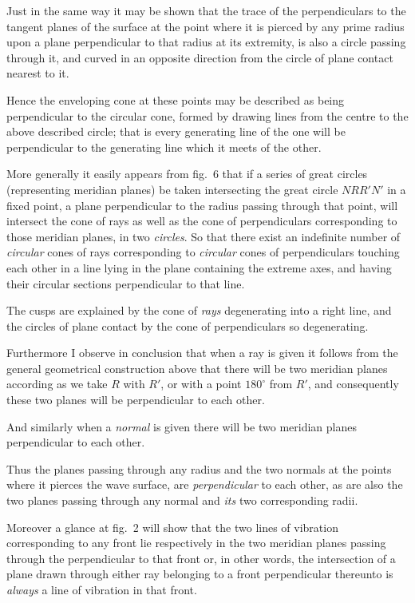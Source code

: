 \documentclass[11pt]{article}
\newcommand{\sourcepage}[1]{\marginpar{\scriptsize p.~#1}}
\begin{document}
\sourcepage{23}
Just in the same way it may be shown that the trace of the perpendiculars to the tangent planes of the surface at the point where it is pierced by any prime radius upon a plane perpendicular to that radius at its extremity, is also a circle passing through it, and curved in an opposite direction from the circle of plane contact nearest to it.

Hence the enveloping cone at these points may be described as being perpendicular to the circular cone, formed by drawing lines from the centre to the above described circle; that is every generating line of the one will be perpendicular to the generating line which it meets of the other.

More generally it easily appears from fig.~6 that if a series of great circles (representing meridian planes) be taken intersecting the great circle $NRR'N'$ in a fixed point, a plane perpendicular to the radius passing through that point, will intersect the cone of rays as well as the cone of perpendiculars corresponding to those meridian planes, in two \emph{circles}. So that there exist an indefinite number of \emph{circular} cones of rays corresponding to \emph{circular} cones of perpendiculars touching each other in a line lying in the plane containing the extreme axes, and having their circular sections perpendicular to that line.

The cusps are explained by the cone of \emph{rays} degenerating into a right line, and the circles of plane contact by the cone of perpendiculars so degenerating.

Furthermore I observe in conclusion that when a ray is given it follows from the general geometrical construction above that there will be two meridian planes according as we take $R$ with $R'$, or with a point $180^\circ$ from $R'$, and consequently these two planes will be perpendicular to each other.

And similarly when a \emph{normal} is given there will be two meridian planes perpendicular to each other.

Thus the planes passing through any radius and the two normals at the points where it pierces the wave surface, are \emph{perpendicular} to each other, as are also the two planes passing through any normal and \emph{its} two corresponding radii.

Moreover a glance at fig.~2 will show that the two lines of vibration corresponding to any front lie respectively in the two meridian planes passing through the perpendicular to that front or, in other words, the intersection of a plane drawn through either ray belonging to a front perpendicular thereunto is \emph{always} a line of vibration in that front.
\end{document}
